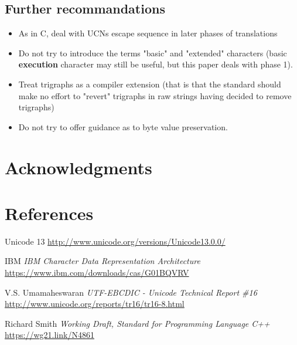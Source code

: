 \documentclass{wg21}
\begin{document}
\subsection{Further recommandations}

\begin{itemize}
\item As in C, deal with UCNs escape sequence in later phases of translations
\item Do not try to introduce the terms "basic" and "extended" characters (basic \textbf{execution} character may still be useful, but this paper  deals with phase 1).
\item Treat trigraphs as a compiler extension (that is that the standard should make no effort to "revert" trigraphs in raw strings having decided to remove trigraphs)
\item Do not try to offer guidance as to byte value preservation.
\end{itemize}


\section{Acknowledgments}


\section{References}
\renewcommand{\section}[2]{}%



\begin{thebibliography}{9}
    
    Unicode 13\newline
    \url{http://www.unicode.org/versions/Unicode13.0.0/}

    IBM\newline
    \emph{IBM Character Data Representation Architecture}\newline
    \url{https://www.ibm.com/downloads/cas/G01BQVRV}
    
    
    V.S. Umamaheswaran\newline
    \emph{UTF-EBCDIC - Unicode Technical Report \#16}\newline
    \url{http://www.unicode.org/reports/tr16/tr16-8.html}

    Richard Smith\newline
    \emph{Working Draft, Standard for Programming Language C++}\newline
    \url{https://wg21.link/N4861}

\end{thebibliography}
\end{document}
